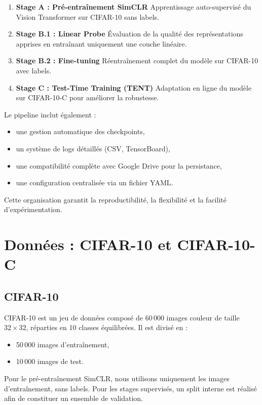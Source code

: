 \documentclass[12pt,a4paper]{report}
\begin{document}
	\begin{enumerate}
		\item \textbf{Stage A : Pré-entraînement SimCLR}  
		Apprentissage auto-supervisé du Vision Transformer sur CIFAR-10 sans labels.
		\item \textbf{Stage B.1 : Linear Probe}  
		Évaluation de la qualité des représentations apprises en entraînant uniquement une couche linéaire.
		\item \textbf{Stage B.2 : Fine-tuning}  
		Réentraînement complet du modèle sur CIFAR-10 avec labels.
		\item \textbf{Stage C : Test-Time Training (TENT)}  
		Adaptation en ligne du modèle sur CIFAR-10-C pour améliorer la robustesse.
	\end{enumerate}
	
	Le pipeline inclut également :
	\begin{itemize}
		\item une gestion automatique des checkpoints,
		\item un système de logs détaillés (CSV, TensorBoard),
		\item une compatibilité complète avec Google Drive pour la persistance,
		\item une configuration centralisée via un fichier YAML.
	\end{itemize}
	
	Cette organisation garantit la reproductibilité, la flexibilité et la facilité d’expérimentation.
	
	\section{Données : CIFAR-10 et CIFAR-10-C}
	
	\subsection*{CIFAR-10}
	CIFAR-10 est un jeu de données composé de 60\,000 images couleur de taille $32 \times 32$, réparties en 10 classes équilibrées. Il est divisé en :
	\begin{itemize}
		\item 50\,000 images d’entraînement,
		\item 10\,000 images de test.
	\end{itemize}
	
	Pour le pré-entraînement SimCLR, nous utilisons uniquement les images d’entraînement, sans labels. Pour les stages supervisés, un split interne est réalisé afin de constituer un ensemble de validation.
	
\end{document}
